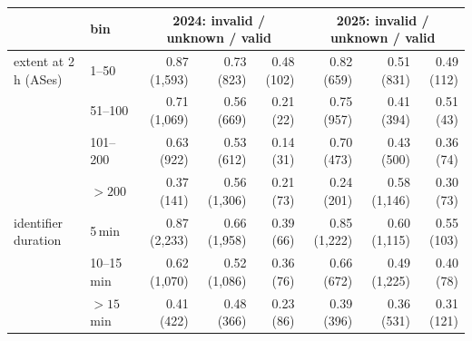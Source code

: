 \begin{tabular}{llrrrrrr}
\toprule
 & bin & \multicolumn{3}{c}{2024: invalid / unknown / valid} & \multicolumn{3}{c}{2025: invalid / unknown / valid} \\
\midrule
extent at 2\,h (ASes) & 1--50 & 0.87 (1,593) & 0.73 (823) & 0.48 (102) & 0.82 (659) & 0.51 (831) & 0.49 (112) \\
 & 51--100 & 0.71 (1,069) & 0.56 (669) & 0.21 (22) & 0.75 (957) & 0.41 (394) & 0.51 (43) \\
 & 101--200 & 0.63 (922) & 0.53 (612) & 0.14 (31) & 0.70 (473) & 0.43 (500) & 0.36 (74) \\
 & $>200$ & 0.37 (141) & 0.56 (1,306) & 0.21 (73) & 0.24 (201) & 0.58 (1,146) & 0.30 (73) \\
\midrule
identifier duration & 5\,min & 0.87 (2,233) & 0.66 (1,958) & 0.39 (66) & 0.85 (1,222) & 0.60 (1,115) & 0.55 (103) \\
 & 10--15\,min & 0.62 (1,070) & 0.52 (1,086) & 0.36 (76) & 0.66 (672) & 0.49 (1,225) & 0.40 (78) \\
 & $>15$\,min & 0.41 (422) & 0.48 (366) & 0.23 (86) & 0.39 (396) & 0.36 (531) & 0.31 (121) \\
\bottomrule
\end{tabular}
